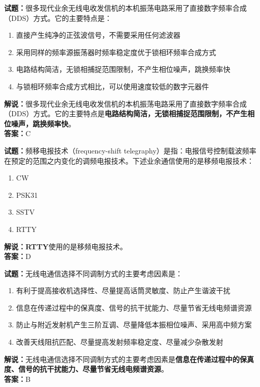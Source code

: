 \documentclass{ctexbook}
\begin{document}

\bigskip


\noindent\textbf{试题：}很多现代业余无线电收发信机的本机振荡电路采用了直接数字频率合成（DDS）方式。它的主要特点是：
\begin{enumerate}[leftmargin=3em]
\item 直接产生纯净的正弦波信号，不需要采用任何滤波器
\item 采用同样的频率源振荡器时频率稳定度优于锁相环频率合成方式
\item 电路结构简洁，无锁相捕捉范围限制，不产生相位噪声，跳换频率快
\item 与锁相环频率合成方式相比，可以使用速度较低的数字元器件
\end{enumerate}
\noindent\textbf{解说：}很多现代业余无线电收发信机的本机振荡电路采用了直接数字频率合成（DDS）方式。它的主要特点是\textbf{电路结构简洁，无锁相捕捉范围限制，不产生相位噪声，跳换频率快}。\\\noindent\textbf{答案：}C


\bigskip


\noindent\textbf{试题：}频移电报技术（frequency-shift telegraphy）是指：电报信号控制载波频率在预定的范围之内变化的调频电报技术。下述业余通信使用的是移频电报技术：
\begin{enumerate}[leftmargin=3em]
\item CW
\item PSK31
\item SSTV
\item RTTY
\end{enumerate}
\noindent\textbf{解说：}\textbf{RTTY}使用的是移频电报技术。\\\noindent\textbf{答案：}D



\bigskip


\noindent\textbf{试题：}无线电通信选择不同调制方式的主要考虑因素是：
\begin{enumerate}[leftmargin=3em]
\item 有利于提高接收机选择性、尽量提高话筒灵敏度、防止产生谐波干扰
\item 信息在传递过程中的保真度、信号的抗干扰能力、尽量节省无线电频谱资源
\item 防止与附近发射机产生三阶互调、尽量降低本振相位噪声、采用高中频方案
\item 改善天线阻抗匹配、尽量提高发射频率稳定度、尽量减少杂散发射
\end{enumerate}
\noindent\textbf{解说：}无线电通信选择不同调制方式的主要考虑因素是\textbf{信息在传递过程中的保真度、信号的抗干扰能力、尽量节省无线电频谱资源}。\\\noindent\textbf{答案：}B
\end{document}
